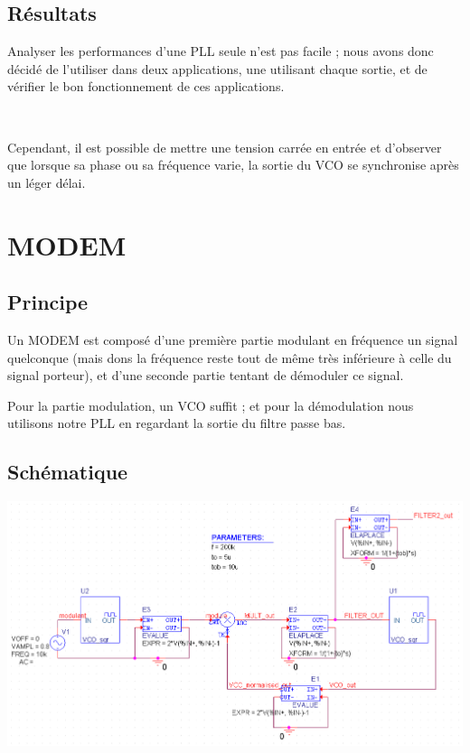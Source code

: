 \documentclass[11pt]{article}
\begin{document}
\subsection{Résultats}

Analyser les performances d’une PLL seule n’est pas facile ; nous avons donc décidé de l’utiliser dans deux applications, une utilisant chaque sortie, et de vérifier le bon fonctionnement de ces applications.

~

Cependant, il est possible de mettre une tension carrée en entrée et d’observer que lorsque sa phase ou sa fréquence varie, la sortie du VCO se synchronise après un léger délai.

\section{MODEM}

\subsection{Principe}

Un MODEM est composé d’une première partie modulant en fréquence un signal quelconque (mais dons la fréquence reste tout de même très inférieure à celle du signal porteur), et d’une seconde partie tentant de démoduler ce signal.

Pour la partie modulation, un VCO suffit ; et pour la démodulation nous utilisons notre PLL en regardant la sortie du filtre passe bas.

\subsection{Schématique}

\includegraphics[width=\linewidth]{modem_sch.png}
\end{document}
